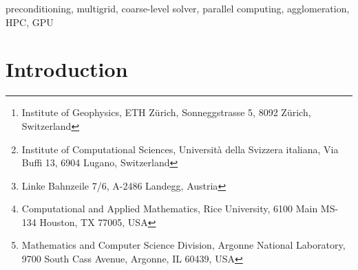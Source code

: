 \documentclass[]{siamart0216}
\title{{\TheTitle}}
\author{
Dave A. May
       \thanks{Institute of Geophysics, ETH Z{\"u}rich, 
       Sonneggstrasse 5, 8092 Z{\"u}rich, Switzerland
       \email{dave.may@erdw.ethz.ch}}
\and
Patrick Sanan
       \thanks{Institute of Computational Sciences, 
       Universit{\`a} della Svizzera italiana, 
       Via Buffi 13, 6904 Lugano, Switzerland
       \email{patrick.sanan@usi.ch}}
\and
Karl Rupp
       \thanks{Linke Bahnzeile 7/6, 
       A-2486 Landegg, Austria
       \email{me@karlrupp.net}}
\and  Matthew G. Knepley
       \thanks{Computational and Applied Mathematics, Rice University, 
       6100 Main MS-134
       Houston, TX 77005, USA
       \email{knepley@rice.edu}}
\and
Barry F. Smith
       \thanks{Mathematics and Computer Science Division, 
       Argonne National Laboratory, 
       9700 South Cass Avenue, 
       Argonne, IL 60439, USA
       \email{bsmith@mcs.anl.gov}}
}
\begin{document}
\maketitle

\begin{abstract}
Elliptic partial differential equations (PDEs) frequently arise in continuum descriptions of physical processes relevant to science and engineering. 
Multilevel preconditioners represent a family of scalable techniques for solving discrete PDEs of this type and thus 
are the method of choice for high-resolution simulations.
The scalability and time-to-solution of massively parallel multilevel preconditioners can be adversely effected 
by using a coarse-level solver with sub-optimal algorithmic complexity.
To maintain scalability, agglomeration techniques applied to the coarse level have been shown to be necessary.

In this work, we present a new software component introduced within the 
Portable Extensible Toolkit for Scientific computation (PETSc) which permits agglomeration. 
We provide an overview of the design and implementation of this functionality, 
together with several use cases highlighting the benefits of agglomeration. 
Lastly, we demonstrate via numerical experiments employing geometric multigrid with structured meshes,
 the flexibility 
and performance gains possible using our MPI-rank agglomeration implementation.
\end{abstract}


\begin{keywords}
	preconditioning, multigrid, coarse-level solver, parallel computing, agglomeration, HPC, GPU
\end{keywords}



\section{Introduction} \label{sec:intro}
\end{document}
